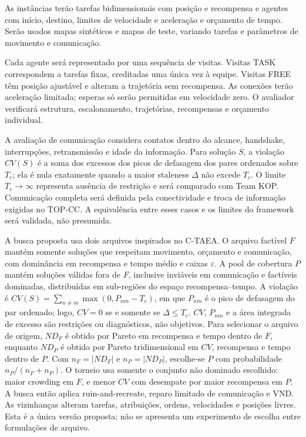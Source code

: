 \documentclass[mscproposta,portugues]{ppgccufmg}
\begin{document}
As instâncias terão tarefas bidimensionais com posição e recompensa e agentes com início, destino, limites de velocidade e aceleração e orçamento de tempo. Serão usados mapas sintéticos e mapas de teste, variando tarefas e parâmetros de movimento e comunicação.

Cada agente será representado por uma sequência de visitas. Visitas TASK correspondem a tarefas fixas, creditadas uma única vez à equipe. Visitas FREE têm posição ajustável e alteram a trajetória sem recompensa. As conexões terão aceleração limitada; esperas só serão permitidas em velocidade zero. O avaliador verificará estrutura, escalonamento, trajetórias, recompensas e orçamento individual.

A avaliação de comunicação considera contatos dentro do alcance, handshake, interrupções, retransmissão e idade da informação. Para solução $S$, a violação $CV(S)$ é a soma dos excessos dos picos de defasagem dos pares ordenados sobre $T_c$; ela é nula exatamente quando a maior staleness $\Delta$ não excede $T_c$. O limite $T_c\to\infty$ representa ausência de restrição e será comparado com Team KOP. Comunicação completa será definida pela conectividade e troca de informação exigidas no TOP-CC. A equivalência entre esses casos e os limites do framework será validada, não presumida.

A busca proposta usa dois arquivos inspirados no C-TAEA. O arquivo factível $F$ mantém somente soluções que respeitam movimento, orçamento e comunicação, com dominância em recompensa e tempo médio e caixas $\varepsilon$. A pool de cobertura $P$ mantém soluções válidas fora de $F$, inclusive inviáveis em comunicação e factíveis dominadas, distribuídas em sub-regiões do espaço recompensa--tempo. A violação é $CV(S)=\sum_{n\ne m}\max(0,P_{nm}-T_c)$, em que $P_{nm}$ é o pico de defasagem do par ordenado; logo, $CV=0$ se e somente se $\Delta\le T_c$. $CV$, $P_{nm}$ e a área integrada de excesso são restrições ou diagnósticos, não objetivos. Para selecionar o arquivo de origem, $ND_F$ é obtido por Pareto em recompensa e tempo dentro de $F$, enquanto $ND_P$ é obtido por Pareto tridimensional em $CV$, recompensa e tempo dentro de $P$. Com $n_F=|ND_F|$ e $n_P=|ND_P|$, escolhe-se $P$ com probabilidade $n_P/(n_F+n_P)$. O torneio usa somente o conjunto não dominado escolhido: maior crowding em $F$, e menor $CV$ com desempate por maior recompensa em $P$. A busca então aplica ruin-and-recreate, reparo limitado de comunicação e VND. As vizinhanças alteram tarefas, atribuições, ordens, velocidades e posições livres. Esta é a única versão proposta; não se apresenta um experimento de escolha entre formulações de arquivo.
\end{document}
